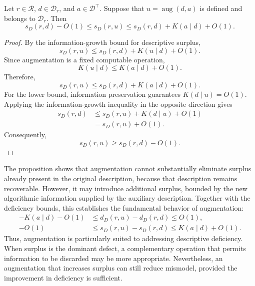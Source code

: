 \begin{proposition}
\label{prop:augmentation_surplus_growth}
Let $r\in\mathcal R$, $d\in\mathcal D_r$, and $a\in\mathcal D^\top$. Suppose that $u=\operatorname{aug}(d,a)$ is defined and belongs to $\mathcal D_r$. Then
\[
s_D(r,d)-O(1) \le s_D(r,u) \le s_D(r,d)+K(a\mid d)+O(1).
\]
\end{proposition}
\begin{proof}
By the information-growth bound for descriptive surplus,
\[
s_D(r,u) \le s_D(r,d) + K(u\mid d) + O(1).
\]
Since augmentation is a fixed computable operation,
\[
K(u\mid d)\le K(a\mid d)+O(1).
\]
Therefore,
\[
s_D(r,u) \le s_D(r,d) + K(a\mid d) + O(1).
\]
For the lower bound, information preservation guarantees $K(d\mid u)=O(1)$. Applying the information-growth inequality in the opposite direction gives
\[
\begin{aligned}
s_D(r,d)
& \le s_D(r,u)+K(d\mid u)+O(1)\\
& = s_D(r,u)+O(1).
\end{aligned}
\]
Consequently,
\[
s_D(r,u)\ge s_D(r,d)-O(1).
\]
\end{proof}

The proposition shows that augmentation cannot substantially eliminate surplus already present in the original description, because that description remains recoverable. However, it may introduce additional surplus, bounded by the new algorithmic information supplied by the auxiliary description. Together with the deficiency bounds, this establishes the fundamental behavior of augmentation:
\[
\begin{aligned}
-K(a\mid d)-O(1)
& \le d_D(r,u)-d_D(r,d) \le O(1),\\
-O(1)
& \le s_D(r,u)-s_D(r,d) \le K(a\mid d)+O(1).
\end{aligned}
\]
Thus, augmentation is particularly suited to addressing descriptive deficiency. When surplus is the dominant defect, a complementary operation that permits information to be discarded may be more appropriate. Nevertheless, an augmentation that increases surplus can still reduce mismodel, provided the improvement in deficiency is sufficient.

